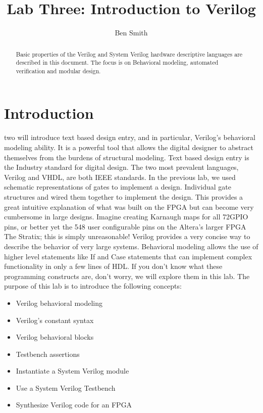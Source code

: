 \title{Lab Three: Introduction to Verilog}
\author{Ben Smith}




  \maketitle
    \begin{abstract}
      Basic properties of the Verilog and System Verilog hardware descriptive languages are described in this document. The focus is on Behavioral modeling, automated verification and modular design.
    \end{abstract}
  \section{Introduction}
     two will introduce text based design entry, and in particular, Verilog's behavioral modeling ability. It is a powerful tool that allows the digital designer to abstract themselves from the burdens of structural modeling.  Text based design entry is the Industry standard for digital design. The two most prevalent languages, Verilog and VHDL, are both IEEE standards. In the previous lab,  we used schematic representations of gates to implement a design. Individual gate structures and wired them together to implement the design. This provides a great intuitive explanation of what was built on the FPGA but can become very cumbersome in large designs.  Imagine creating Karnaugh maps for all 72GPIO pins, or better yet the 548 user configurable pins on the Altera's larger FPGA The Stratix\cite{Altera:StratixVDeviceOverview}; this is simply unreasonable! Verilog provides a very concise way to describe the behavior of very large systems. Behavioral modeling allows the use of higher level statements like If and Case statements that can implement complex functionality in only a few lines of HDL. If you don't know what these programming constructs are, don't worry, we will explore them in this lab. The purpose of this lab is to introduce the following concepts:
    \begin{itemize}
      \item Verilog behavioral modeling
      \item Verilog's constant syntax
      \item Verilog behavioral blocks
      \item Testbench assertions
      \item Instantiate a System Verilog module
      \item Use a System Verilog Testbench
      \item Synthesize Verilog code for an FPGA
    \end{itemize}

